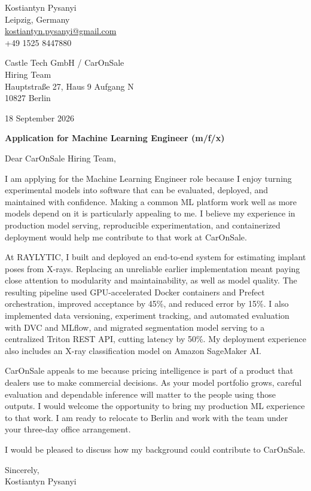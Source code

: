 \documentclass[11pt,a4paper]{article}
\begin{document}
\begin{flushright}
Kostiantyn Pysanyi\\
Leipzig, Germany\\
\href{mailto:kostiantyn.pysanyi@gmail.com}{kostiantyn.pysanyi@gmail.com}\\
+49 1525 8447880
\end{flushright}

Castle Tech GmbH / CarOnSale\\
Hiring Team\\
Hauptstra\ss e 27, Haus 9 Aufgang N\\
10827 Berlin

\begin{flushright}
18 September 2026
\end{flushright}

\textbf{Application for Machine Learning Engineer (m/f/x)}

Dear CarOnSale Hiring Team,

I am applying for the Machine Learning Engineer role because I enjoy turning experimental models into software that can be evaluated, deployed, and maintained with confidence. Making a common ML platform work well as more models depend on it is particularly appealing to me. I believe my experience in production model serving, reproducible experimentation, and containerized deployment would help me contribute to that work at CarOnSale.

At RAYLYTIC, I built and deployed an end-to-end system for estimating implant poses from X-rays. Replacing an unreliable earlier implementation meant paying close attention to modularity and maintainability, as well as model quality. The resulting pipeline used GPU-accelerated Docker containers and Prefect orchestration, improved acceptance by 45\%, and reduced error by 15\%. I also implemented data versioning, experiment tracking, and automated evaluation with DVC and MLflow, and migrated segmentation model serving to a centralized Triton REST API, cutting latency by 50\%. My deployment experience also includes an X-ray classification model on Amazon SageMaker AI.

CarOnSale appeals to me because pricing intelligence is part of a product that dealers use to make commercial decisions. As your model portfolio grows, careful evaluation and dependable inference will matter to the people using those outputs. I would welcome the opportunity to bring my production ML experience to that work. I am ready to relocate to Berlin and work with the team under your three-day office arrangement.

I would be pleased to discuss how my background could contribute to CarOnSale.

Sincerely,\\[0.8em]
Kostiantyn Pysanyi
\end{document}
